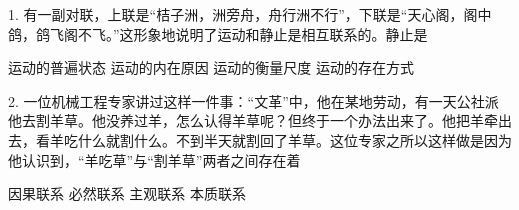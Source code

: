 1. 有一副对联，上联是“桔子洲，洲旁舟，舟行洲不行”，下联是“天心阁，阁中鸽，鸽飞阁不飞。”这形象地说明了运动和静止是相互联系的。静止是%
\begin{choices}
	 运动的普遍状态
	 运动的内在原因
	 运动的衡量尺度
	 运动的存在方式
\end{choices}

2. 一位机械工程专家讲过这样一件事：“文革”中，他在某地劳动，有一天公社派他去割羊草。他没养过羊，怎么认得羊草呢？但终于一个办法出来了。他把羊牵出去，看羊吃什么就割什么。不到半天就割回了羊草。这位专家之所以这样做是因为他认识到，“羊吃草”与“割羊草”两者之间存在着
\begin{choices}
	 因果联系
	 必然联系
	 主观联系
	 本质联系
\end{choices}

